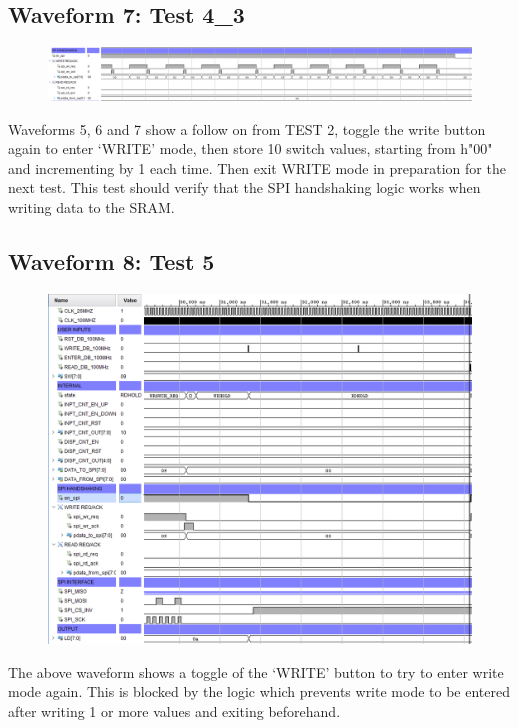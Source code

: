 \documentclass[11pt]{report}
\begin{document}
\subsection*{Waveform 7: Test 4\_3}
\begin{figure}[H]
    \includegraphics[width=\columnwidth]{Reports/Proj/Task3/Assets/Test4_3.PNG}
\end{figure}

Waveforms 5, 6 and 7 show a follow on from TEST 2, toggle the write button again to enter `WRITE' mode, then store 10 switch values, starting from h"00" and incrementing by 1 each time. Then exit WRITE mode in preparation for the next test. This test should verify that the SPI handshaking logic works when writing data to the SRAM.

\subsection*{Waveform 8: Test 5}
\begin{figure}[H]
    \includegraphics[width=\columnwidth]{Reports/Proj/Task3/Assets/Test5.PNG}
\end{figure}

The above waveform shows a toggle of the `WRITE' button to try to enter write mode again. This is blocked by the logic which prevents write mode to be entered after writing 1 or more values and exiting beforehand.
\end{document}
